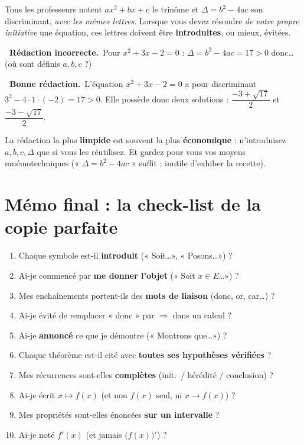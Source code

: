 \documentclass[11pt,a4paper]{article}
\newcommand{\ok}{\textcolor{METeal}{\textbf{\ding{51}\ \sffamily Bonne rédaction.}}\ }
\newcommand{\ko}{\textcolor{MECoral}{\textbf{\ding{55}\ \sffamily Rédaction incorrecte.}}\ }
\newcommand{\ra}{\longrightarrow}
\begin{document}
Tous les professeurs notent $ax^2+bx+c$ le trinôme et $\Delta=b^2-4ac$ son discriminant,
\emph{avec les mêmes lettres}. Lorsque vous devez résoudre \emph{de votre propre initiative}
une équation, ces lettres doivent être \textbf{introduites}, ou mieux, évitées.
\begin{mauvaise}
\ko Pour $x^2+3x-2=0$ : $\Delta=b^2-4ac=17>0$ donc\dots \quad(où sont définis $a,b,c$ ?)
\end{mauvaise}
\begin{bonne}
\ok L'équation $x^2+3x-2=0$ a pour discriminant $3^2-4\cdot1\cdot(-2)=17>0$. Elle possède donc
deux solutions : $\dfrac{-3+\sqrt{17}}{2}$ et $\dfrac{-3-\sqrt{17}}{2}$.
\end{bonne}
\begin{astuce}
La rédaction la plus \textbf{limpide} est souvent la plus \textbf{économique} : n'introduisez
$a,b,c,\Delta$ que si vous les réutilisez. Et gardez pour vous vos moyens mnémotechniques
(« $\Delta=b^2-4ac$ » suffit ; inutile d'exhiber la recette).
\end{astuce}

\newpage
\section{Mémo final : la check-list de la copie parfaite}

\begin{tcolorbox}[enhanced,colback=METealLight,colframe=METeal,arc=3pt,boxrule=1pt,
  fonttitle=\sffamily\bfseries,coltitle=white,
  attach boxed title to top left={yshift=-2mm,xshift=4mm},
  boxed title style={colback=METeal,arc=2pt,boxrule=0pt},
  title={\sffamily\bfseries AVANT DE RENDRE, VÉRIFIEZ}]
\begin{enumerate}[label=\textcolor{METeal}{\ding{51}},leftmargin=1.7em]
  \item Chaque symbole est-il \textbf{introduit} (« Soit\dots », « Posons\dots ») ?
  \item Ai-je commencé par \textbf{me donner l'objet} (« Soit $x\in E$\dots ») ?
  \item Mes enchaînements portent-ils des \textbf{mots de liaison} (donc, or, car\dots) ?
  \item Ai-je évité de remplacer « donc » par $\Longrightarrow$ dans un calcul ?
  \item Ai-je \textbf{annoncé} ce que je démontre (« Montrons que\dots ») ?
  \item Chaque théorème est-il cité avec \textbf{toutes ses hypothèses vérifiées} ?
  \item Mes récurrences sont-elles \textbf{complètes} (init.\ / hérédité / conclusion) ?
  \item Ai-je écrit $x\mapsto f(x)$ (et non $f(x)$ seul, ni $x\ra f(x)$) ?
  \item Mes propriétés sont-elles énoncées \textbf{sur un intervalle} ?
  \item Ai-je noté $f'(x)$ (et jamais $\big(f(x)\big)'$) ?
\end{enumerate}
\end{tcolorbox}
\end{document}
